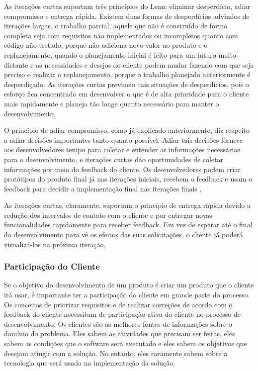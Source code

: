 As iterações curtas suportam três princípios do Lean: eliminar desperdício, adiar compromisso e entrega rápida. Existem duas formas de desperdícios advindos de iterações largas, o trabalho parcial, aquele que não é construído de forma completa seja com requisitos não implementados ou incompletos quanto com código não testado, porque não adiciona novo valor ao produto e o replanejamento, quando o planejamento inicial é feito para um futuro muito distante e as necessidades e desejos do cliente podem mudar fazendo com que seja preciso o realizar o replanejamento, porque o trabalho planejado anteriormente é desperdiçado. As iterações curtas previnem tais situações de desperdícios, pois o esforço fica concentrado em desenvolver o que é de alta prioridade para o cliente mais rapidamente e planeja tão longe quanto necessário para manter o desenvolvimento.  

O princípio de adiar compromisso, como já explicado anteriormente, diz respeito a adiar decisões importantes tanto quanto possível. Adiar tais decisões fornece aos desenvolvedores tempo para coletar e entender as informações necessárias para o desenvolvimento, e iterações curtas dão oportunidades de coletar informações por meio do feedback do cliente. Os desenvolvedores podem criar protótipos do produto final já nas iterações iniciais, recebem o feedback e usam o feedback para decidir a implementação final nas iterações finais \cite{hibbs2009}.

As iterações curtas, claramente, suportam o princípio de entrega rápida devido a redução dos intervalos de contato com o cliente e por entregar novas funcionalidades rapidamente para receber feedback. Em vez de esperar até o final do desenvolvimento para vê os efeitos das suas solicitações, o cliente já poderá visualizá-los na próxima iteração. 

\subsubsection[Participação do Cliente]{Participação do Cliente}

Se o objetivo do desenvolvimento de um produto é criar um produto que o cliente irá usar, é importante ter a participação do cliente em grande parte do processo. Os conceitos de priorizar requisitos e de realizar correções de acordo com o feedback do cliente necessitam de participação ativa do cliente no processo de desenvolvimento. 
Os clientes são as melhores fontes de informações sobre o domínio do problema.  Eles sabem as atividades que precisam ser feitas, eles sabem as condições que o software será executado e eles sabem os objetivos que desejam atingir com a solução. No entanto, eles raramente sabem sobre a tecnologia que será usada na implementação da solução.  

